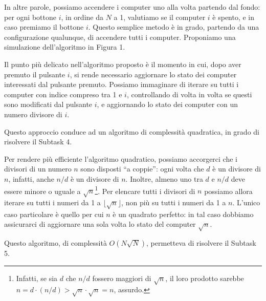In altre parole, possiamo accendere i computer uno alla volta partendo dal fondo: per ogni bottone $i$, in ordine da $N$ a 1, valutiamo se il computer $i$ è spento, e in caso premiamo il bottone $i$. Questo semplice metodo è in grado, partendo da una configurazione qualunque, di accendere tutti i computer. Proponiamo una simulazione dell'algoritmo in Figura 1.

\Nquadro
Il punto più delicato nell'algoritmo proposto è il momento in cui, dopo aver premuto il pulsante $i$, si rende necessario aggiornare lo stato dei computer interessati dal pulsante premuto. Possiamo immaginare di iterare su tutti i computer con indice compreso tra 1 e $i$, controllando di volta in volta se questi sono modificati dal pulsante $i$, e aggiornando lo stato dei computer con un numero divisore di $i$.

Questo approccio conduce ad un algoritmo di complessità quadratica, in grado di risolvere il Subtask 4.

\NsqrtN
Per rendere più efficiente l'algoritmo quadratico, possiamo accorgerci che i divisori di un numero $n$ sono disposti ``a coppie'': ogni volta che $d$ è un divisore di $n$, infatti, anche $n/d$ è un divisore di $n$. Inoltre, almeno uno tra $d$ e $n/d$ deve essere minore o uguale a $\sqrt{n}$\footnote{Infatti, se sia $d$ che $n/d$ fossero maggiori di $\sqrt{n}$, il loro prodotto sarebbe $n = d \cdot (n/d) > \sqrt{n} \cdot \sqrt{n} = n$, assurdo.}. Per elencare tutti i divisori di $n$ possiamo allora iterare su tutti i numeri da 1 a $\lfloor \sqrt{n}\rfloor$, non più su tutti i numeri da 1 a $n$. L'unico caso particolare è quello per cui $n$ è un quadrato perfetto: in tal caso dobbiamo assicurarci di aggiornare una sola volta lo stato del computer $\sqrt{n}$.

Questo algoritmo, di complessità $O(N \sqrt{N})$, permetteva di risolvere il Subtask 5.

